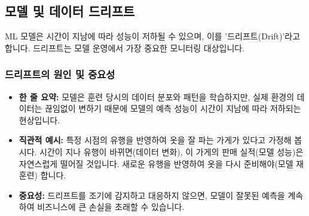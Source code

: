 \documentclass[11pt,a4paper]{article}
\begin{document}
\subsection*{모델 및 데이터 드리프트}
ML 모델은 시간이 지남에 따라 성능이 저하될 수 있으며, 이를 '드리프트(Drift)'라고 합니다. 드리프트는 모델 운영에서 가장 중요한 모니터링 대상입니다.

\subsubsection*{드리프트의 원인 및 중요성}
\begin{itemize}
    \item \textbf{한 줄 요약:} 모델은 훈련 당시의 데이터 분포와 패턴을 학습하지만, 실제 환경의 데이터는 끊임없이 변하기 때문에 모델의 예측 성능이 시간이 지남에 따라 저하되는 현상입니다.
    \item \textbf{직관적 예시:} 특정 시점의 유행을 반영하여 옷을 잘 파는 가게가 있다고 가정해 봅시다. 시간이 지나 유행이 바뀌면(데이터 변화), 이 가게의 판매 실적(모델 성능)은 자연스럽게 떨어질 것입니다. 새로운 유행을 반영하여 옷을 다시 준비해야(모델 재훈련) 합니다.
    \item \textbf{중요성:} 드리프트를 조기에 감지하고 대응하지 않으면, 모델이 잘못된 예측을 계속하여 비즈니스에 큰 손실을 초래할 수 있습니다.
\end{itemize}
\end{document}
